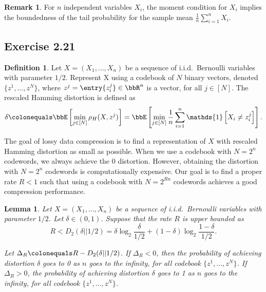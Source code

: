 \documentclass[11pt]{article}
\newcommand{\off}[1]{\left[#1\right]}
\theoremstyle{plain}
\newtheorem{lem}{Lemma}
\theoremstyle{definition}
\newtheorem{defn}{Definition}
\newtheorem{rmk}{Remark}
\begin{document}
 \begin{rmk}
 	For $n$ independent variables $X_i$, the moment condition for $X_i$ implies the boundedness of the tail probability for the sample mean $\frac{1}{n} \sum_{i=1}^n X_i$.
 \end{rmk}
 
 \subsection{Exercise 2.21}
 \begin{defn}
 	Let $X=(X_1,...,X_n)$ be a sequence of i.i.d.\ Bernoulli variables with parameter $1/2$. Represent X using a codebook of $N$ binary vectors, denoted $\{z^1,...,z^N\}$, where $z^j = \entry{z^j_i} \in \bbR^n$ is a vector, for all $j \in [N]$. The rescaled Hamming distortion is defined as
 	\begin{equation}
 		\delta \colonequals \bbE \off{ \min_{j \in [N]} \rho_H(X, z^j) } = \bbE \off{ \min_{j \in [N]} \frac{1}{n} \sum_{i = 1}^n  \mathds{1} \off{X_i \neq z^j_i} }. 
 	\end{equation}
 \end{defn}
 
 The goal of lossy data compression is to find a representation of $X$ with rescaled Hamming distortion as small as possible. When we use a codebook with $N = 2^n$ codewords, we always achieve the 0 distortion. However, obtaining the distortion with $N = 2^n$ codewords is computationally expensive. Our goal is to find a proper rate  $R < 1$ such that using a codebook with $N = 2^{Rn}$ codewords achieves a good compression performance. 
 
 \begin{lem}
 	
 	Let $X=(X_1,...,X_n)$ be a sequence of i.i.d.\ Bernoulli variables with parameter $1/2$. Let $\delta \in (0,1)$. Suppose that the rate $R$ is upper bounded as
 	\begin{equation}
 		R < D_2(\delta || 1/2 ) = \delta \log_2 \frac{\delta}{1/2} + (1-\delta) \log_2 \frac{1-\delta}{1/2}.
 	\end{equation}
 	
 	Let  $\Delta_R \colonequals R - D_2(\delta || 1/2 )$. If $\Delta_R < 0$, 
 	then the probability of achieving distortion $\delta$ goes to 0 as $n$ goes to the infinity, for all codebook $\{z^1,...,z^N\}$. If $\Delta_R > 0$, the probability of achieving distortion $\delta$ goes to 1 as $n$ goes to the infinity, for all codebook $\{z^1,...,z^N\}$.
 	
 \end{lem}
 
\end{document}
